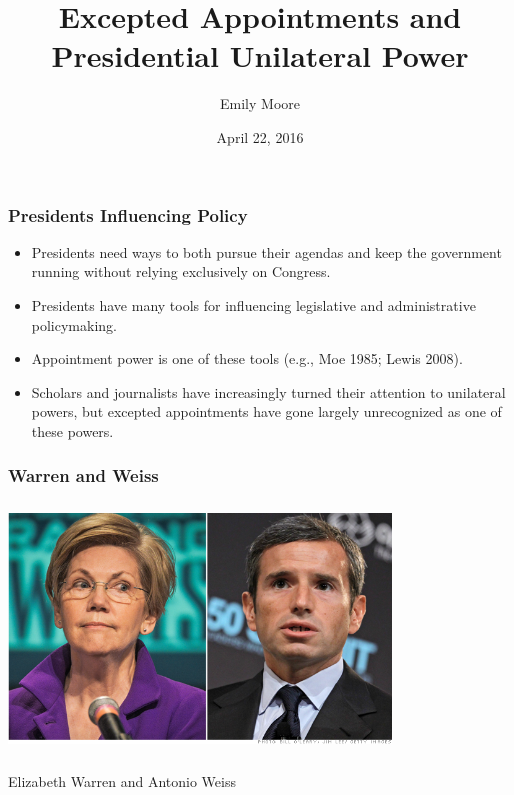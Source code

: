 \documentclass{beamer}
\title[Excepted Appointments and Presidential Unilateral Power]{Excepted Appointments and Presidential Unilateral Power}
\author{Emily Moore}
\institute[WUSTL]
{
Washington University-St. Louis \\
\medskip
{\emph{emily.moore@wustl.edu}}
}
\date{April 22, 2016}
\begin{document}


%
\begin{frame}
\titlepage
\end{frame}
%
%

\begin{frame}
\frametitle{Presidents Influencing Policy}
\large
\begin{itemize}\addtolength{\itemsep}{.75\baselineskip}
\item Presidents need ways to both pursue their agendas and keep the government running without relying exclusively on Congress.
\item Presidents have many tools for influencing legislative and administrative policymaking.
\item Appointment power is one of these tools (e.g., Moe 1985; Lewis 2008).
\item Scholars and journalists have increasingly turned their attention to unilateral powers, but excepted appointments have gone largely unrecognized as one of these powers. 
\end{itemize}
\hfill%
\end{frame}



\begin{frame}
\frametitle{Warren and Weiss}
\begin{center}
\includegraphics[height=2.6in,width=4in]{WarrenWeiss.png}

Elizabeth Warren and Antonio Weiss
\end{center}
\end{frame}
\end{document}
